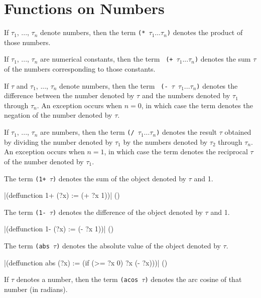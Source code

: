 \section{Functions on Numbers}

If $\tau_1$, ..., $\tau_n$ denote numbers, then the term {\tt (* $\tau_1
\ldots \tau_n$)} denotes the product of those numbers.

If $\tau_1$, ..., $\tau_n$ are numerical constants, then the term {\tt
(+ $\tau_1 ... \tau_n$)} denotes the sum $\tau$ of the numbers
corresponding to those constants.

If $\tau$ and $\tau_1$, ..., $\tau_n$ denote numbers, then the term {\tt
(- $\tau$ $\tau_1 ... \tau_n$)} denotes the difference between the
number denoted by $\tau$ and the numbers denoted by $\tau_1$ through
$\tau_n$.  An exception occurs when $n=0$, in which case the term
denotes the negation of the number denoted by $\tau$.

If $\tau_1$, ..., $\tau_n$ are numbers, then the term {\tt (/ $\tau_1
... \tau_n$)} denotes the result $\tau$ obtained by dividing the number
denoted by $\tau_1$ by the numbers denoted by $\tau_2$ through
$\tau_n$.  An exception occurs when $n=1$, in which case the term
denotes the reciprocal $\tau$ of the number denoted by $\tau_1$.

The term {\tt (1+ $\tau$)} denotes the sum of the object denoted by
$\tau$ and 1. 

\medskip
\verbatim|(deffunction 1+ (?x) :=  (+ ?x 1))|
\hfill(\equation)\par 
\medskip

The term {\tt (1- $\tau$)} denotes the difference of the object denoted
by $\tau$ and 1. 

\medskip
\verbatim|(deffunction 1- (?x) := (- ?x 1))|
\hfill(\equation)\par 
\medskip

The term {\tt (abs $\tau$)} denotes the absolute value of the object
denoted by $\tau$. 

\medskip
\verbatim|(deffunction abs (?x) := (if (>= ?x 0) ?x (- ?x)))|
\hfill(\equation)\par 
\medskip

If $\tau$ denotes a number, then the term {\tt (acos $\tau$)} denotes
the arc cosine of that number (in radians).

